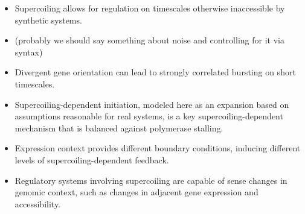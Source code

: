 \documentclass[11pt]{article}
\begin{document}
\begin{itemize}
    \item Supercoiling allows for regulation on timescales otherwise inaccessible by synthetic systems.

    \item (probably we should say something about noise and controlling for it via syntax)

    \item Divergent gene orientation can lead to strongly correlated bursting on short timescales.

    \item Supercoiling-dependent initiation, modeled here as an expansion based on assumptions reasonable for real systems, is a key supercoiling-dependent mechanism that is balanced against polymerase stalling.

    \item Expression context provides different boundary conditions, inducing different levels of supercoiling-dependent feedback.

    \item Regulatory systems involving supercoiling are capable of sense changes in genomic context, such as changes in adjacent gene expression and accessibility.
\end{itemize}
\end{document}
